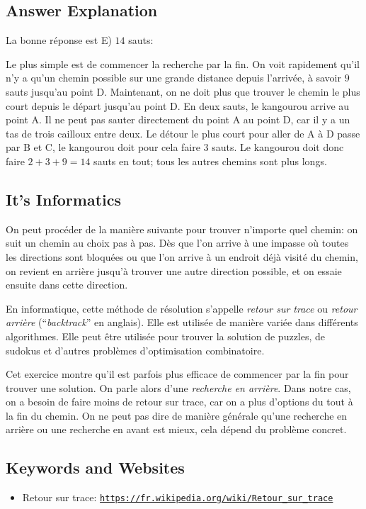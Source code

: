 \documentclass[a4paper,11pt]{report}
\newcommand{\BrochureUrlText}[1]{\texttt{#1}}
\newcommand{\taskGraphicsFolder}{..}
\begin{document}
\endgroup

\subsection*{Answer Explanation}

La bonne réponse est E) $14$ sauts:

{\centering%
\par}

Le plus simple est de commencer la recherche par la fin. On voit rapidement qu’il n’y a qu’un chemin possible sur une grande distance depuis l’arrivée, à savoir $9$ sauts jusqu’au point D. Maintenant, on ne doit plus que trouver le chemin le plus court depuis le départ jusqu’au point D. En deux sauts, le kangourou arrive au point A. Il ne peut pas sauter directement du point A au point D, car il y a un tas de trois cailloux entre deux. Le détour le plus court pour aller de A à D passe par B et C, le kangourou doit pour cela faire $3$ sauts. Le kangourou doit donc faire ${2 + 3 + 9 = 14}$ sauts en tout; tous les autres chemins sont plus longs.


\subsection*{It’s Informatics}

On peut procéder de la manière suivante pour trouver n’importe quel chemin: on suit un chemin au choix pas à pas. Dès que l’on arrive à une impasse où toutes les directions sont bloquées ou que l’on arrive à un endroit déjà visité du chemin, on revient en arrière jusqu’à trouver une autre direction possible, et on essaie ensuite dans cette direction.

En informatique, cette méthode de résolution s’appelle \emph{retour sur trace} ou \emph{retour arrière} (“\emph{backtrack}” en anglais). Elle est utilisée de manière variée dans différents algorithmes. Elle peut être utilisée pour trouver la solution de puzzles, de sudokus et d’autres problèmes d’optimisation combinatoire.

Cet exercice montre qu’il est parfois plus efficace de commencer par la fin pour trouver une solution. On parle alors d’une \emph{recherche en arrière}. Dans notre cas, on a besoin de faire moins de retour sur trace, car on a plus d’options du tout à la fin du chemin. On ne peut pas dire de manière générale qu’une recherche en arrière ou une recherche en avant est mieux, cela dépend du problème concret.

{\raggedright

\subsection*{Keywords and Websites}

\begin{itemize}
  \item Retour sur trace: \href{https://fr.wikipedia.org/wiki/Retour_sur_trace}{\BrochureUrlText{https://fr.wikipedia.org/wiki/Retour\_sur\_trace}}
\end{itemize}


}
\end{document}
